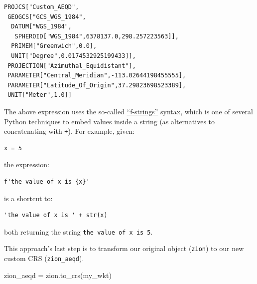 \documentclass[
  letterpaper,
]{krantz}
\newenvironment{Shaded}{\begin{snugshade}}{\end{snugshade}}
\newcommand{\NormalTok}[1]{\textcolor[rgb]{0.00,0.23,0.31}{#1}}
\newcommand{\OperatorTok}[1]{\textcolor[rgb]{0.37,0.37,0.37}{#1}}
\begin{document}
\begin{verbatim}
PROJCS["Custom_AEQD",
 GEOGCS["GCS_WGS_1984",
  DATUM["WGS_1984",
   SPHEROID["WGS_1984",6378137.0,298.257223563]],
  PRIMEM["Greenwich",0.0],
  UNIT["Degree",0.0174532925199433]],
 PROJECTION["Azimuthal_Equidistant"],
 PARAMETER["Central_Meridian",-113.02644198455555],
 PARAMETER["Latitude_Of_Origin",37.29823698523389],
 UNIT["Meter",1.0]]
\end{verbatim}

\begin{tcolorbox}[enhanced jigsaw, title=\textcolor{quarto-callout-note-color}{\faInfo}\hspace{0.5em}{Note}, coltitle=black, colbacktitle=quarto-callout-note-color!10!white, breakable, titlerule=0mm, colframe=quarto-callout-note-color-frame, opacitybacktitle=0.6, colback=white, bottomrule=.15mm, left=2mm, leftrule=.75mm, toprule=.15mm, toptitle=1mm, bottomtitle=1mm, arc=.35mm, opacityback=0, rightrule=.15mm]

The above expression uses the so-called
\href{https://docs.python.org/3/tutorial/inputoutput.html\#tut-f-strings}{``f-strings''}
syntax, which is one of several Python techniques to embed values inside
a string (as alternatives to concatenating with \texttt{+}). For
example, given:

\begin{verbatim}
x = 5
\end{verbatim}

the expression:

\begin{verbatim}
f'the value of x is {x}'
\end{verbatim}

is a shortcut to:

\begin{verbatim}
'the value of x is ' + str(x)
\end{verbatim}

both returning the string
\texttt{\textquotesingle{}the\ value\ of\ x\ is\ 5\textquotesingle{}}.

\end{tcolorbox}

This approach's last step is to transform our original object
(\texttt{zion}) to our new custom CRS (\texttt{zion\_aeqd}).

\begin{Shaded}
\begin{Highlighting}[]
\NormalTok{zion\_aeqd }\OperatorTok{=}\NormalTok{ zion.to\_crs(my\_wkt)}
\end{Highlighting}
\end{Shaded}
\end{document}
